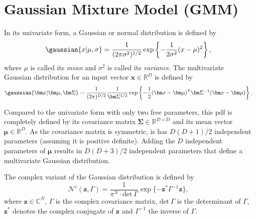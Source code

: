 \section{Gaussian Mixture Model (GMM)}
\label{sec:gmm}
In its univariate form, a Gaussian or normal distribution is defined by
\begin{equation}
	\gaussian{x\vert\mu,\sigma}=\frac{1}{(2\pi\sigma^2)^{1/2}}\exp\left\{-\frac{1}{2\sigma^2}(x-\mu)^2\right\},
\end{equation}
where $\mu$ is called its \textit{mean} and $\sigma^2$ is called its \textit{variance}.
The multivariate Gaussian distribution for an input vector $\bm x\in\mathbb{R}^D$ is defined by
\begin{equation}
	\gaussian{\bm x\vert\bm\mu,\bm\Sigma}=\frac{1}{(2\pi)^{D/2}}\frac{1}{\bm\Sigma^{1/2}}\exp\left\{-\frac{1}{2}(\bm x-\bm\mu)^{\text{T}} \bm\Sigma^{-1}(\bm x-\bm\mu)\right\}.
\end{equation}



Compared to the univariate form with only two free parameters, this \gls{pdf} is completely defined by its covariance matrix $\bm\Sigma\in\mathbb{R}^{D\times D}$ and its mean vector $\bm\mu\in\mathbb{R}^D$. As the covariance matrix is symmetric, is has $D(D+1)/2$ independent parameters (assuming it is positive definite). Adding the $D$ independent parameters of $\bm\mu$ results in $D(D+3)/2$ independent parameters that define a multivariate Gaussian distribution. 

The complex variant of the Gaussian distribution is defined by
\begin{equation}
    \mathcal{N}^c(\bm z,\Gamma)=\frac{1}{\pi^N\cdot\text{det}\ \Gamma}\exp\{ -\bm z^*\Gamma^{-1}\bm z \},
    \label{eq:complexGaussian}
\end{equation}
where $\bm z\in\mathbb{C}^N$, $\Gamma$ is the complex covariance matrix, $\text{det}\ \Gamma$ is the determinant of $\Gamma$, $\bm z^*$ denotes the complex conjugate of $\bm z$ and $\Gamma^{-1}$ the inverse of $\Gamma$. 


